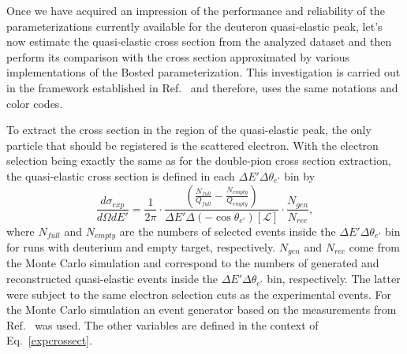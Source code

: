 



Once we have acquired an impression of the performance and reliability of the parameterizations currently available for the deuteron quasi-elastic peak, let's now estimate the quasi-elastic cross section from the analyzed dataset and then perform its comparison with the cross section approximated by various implementations of the Bosted parameterization. This investigation is carried out in the framework established in Ref.~\cite{note_QE_peak} and therefore, uses the same notations and color codes.



To extract the cross section in the region of the quasi-elastic peak, the only particle that should be registered is the scattered electron. With the electron selection being exactly the same as for the double-pion cross section extraction, the quasi-elastic cross section is defined in each $\Delta E' \Delta \theta_{e'}$ bin by \vspace{-1.25em}
\begin{equation}
\frac{d\sigma_{exp}}{d\Omega dE'} = \frac{1}{2\pi} \cdot \frac{\left (\frac{N_{full}}{Q_{full}} - \frac{N_{empty}}{Q_{empty}} \right )}{\Delta E' \Delta(-\cos\theta_{e'}) [\mathcal{L}]} \cdot \frac{N_{gen}}{N_{rec}},\label{eq:my_xsect}
\end{equation}
where $N_{full}$ and $N_{empty}$ are the numbers of selected events inside the $\Delta E' \Delta \theta_{e'}$ bin for runs with deuterium and empty target, respectively. $N_{gen}$ and $N_{rec}$ come from the Monte Carlo simulation and correspond to the numbers of generated and reconstructed quasi-elastic events inside the $\Delta E' \Delta \theta_{e'}$ bin, respectively. The latter were subject to the same electron selection cuts as the experimental events. For the Monte Carlo simulation an event generator based on the measurements from Ref.~\cite{Osipenko:2005gt} was used. The other variables are defined in the context of Eq.~\eqref{expcrossect}.


